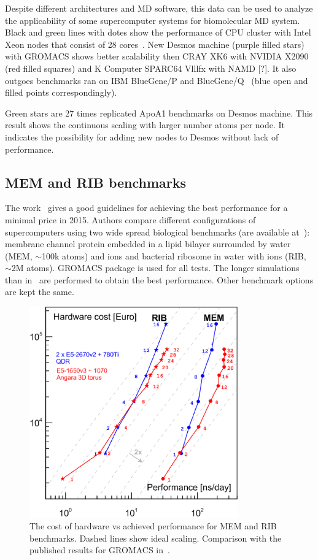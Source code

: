 \documentclass{llncs}
\begin{document}
Despite different architectures and MD software, this data can be used to analyze the applicability of some supercomputer systems for biomolecular MD system. Black and green lines with dotes show the performance of CPU cluster with Intel Xeon nodes that consist of 28 cores~\cite{Smirnov2016}. New Desmos machine (purple filled stars) with GROMACS shows better scalability then CRAY XK6 with NVIDIA X2090~\cite{Sun2012} (red filled squares) and K Computer SPARC64 Vlllfx with NAMD [?]. It also outgoes benchmarks ran on IBM BlueGene/P and BlueGene/Q~\cite{Kumar2013} (blue open and filled points correspondingly). 

Green stars are 27 times replicated ApoA1 benchmarks on Desmos machine. This result shows the continuous scaling with larger number atoms per node. It indicates the possibility for adding new nodes to Desmos without lack of performance.

\subsection{MEM and RIB benchmarks}

The work~\cite{Kutzner2015} gives a good guidelines for achieving the best performance for a minimal price in 2015. Authors compare different configurations of supercomputers using two wide spread biological benchmarks (are available at~\cite{bench}): membrane channel protein embedded in a lipid bilayer surrounded by water (MEM, $\sim $100k atoms) and ions and bacterial ribosome in water with ions (RIB, $\sim$2M atoms). GROMACS package is used for all tests. The longer simulations than in~\cite{Kutzner2015} are performed to obtain the best performance. Other benchmark options are kept the same.

\begin{figure}[h]
\centering
\includegraphics[width=0.8\textwidth]{img/best_bang.eps}
\caption{\label{BestBang}The cost of hardware vs achieved performance for MEM and RIB benchmarks. Dashed lines show ideal scaling. Comparison with the published results for GROMACS in~\cite{Kutzner2015}.}
\end{figure}
\end{document}
